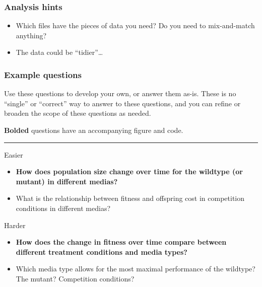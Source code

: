 \documentclass[
  letterpaper,
  DIV=11,
  numbers=noendperiod]{scrreprt}
\providecommand{\tightlist}{%
  \setlength{\itemsep}{0pt}\setlength{\parskip}{0pt}}\usepackage{longtable,booktabs,array}
\begin{document}
\begin{tcolorbox}[enhanced jigsaw, left=2mm, colframe=quarto-callout-tip-color-frame, leftrule=.75mm, opacitybacktitle=0.6, toptitle=1mm, title=\textcolor{quarto-callout-tip-color}{\faLightbulb}\hspace{0.5em}{Tip}, opacityback=0, coltitle=black, colbacktitle=quarto-callout-tip-color!10!white, breakable, colback=white, titlerule=0mm, bottomrule=.15mm, arc=.35mm, bottomtitle=1mm, rightrule=.15mm, toprule=.15mm]

\hypertarget{analysis-hints}{%
\subsubsection{Analysis hints}\label{analysis-hints}}

\begin{itemize}
\item
  Which files have the pieces of data you need? Do you need to
  mix-and-match anything?
\item
  The data could be ``tidier''\ldots{}
\end{itemize}

\hypertarget{example-questions}{%
\subsubsection{Example questions}\label{example-questions}}

Use these questions to develop your own, or answer them as-is. These is
no ``single'' or ``correct'' way to answer to these questions, and you
can refine or broaden the scope of these questions as needed.

\textbf{Bolded} questions have an accompanying figure and code.

\begin{center}\rule{0.5\linewidth}{0.5pt}\end{center}

Easier

\begin{itemize}
\tightlist
\item
  \textbf{How does population size change over time for the wildtype (or
  mutant) in different medias?}
\item
  What is the relationship between fitness and offspring cost in
  competition conditions in different medias?
\end{itemize}

Harder

\begin{itemize}
\tightlist
\item
  \textbf{How does the change in fitness over time compare between
  different treatment conditions and media types?}
\item
  Which media type allows for the most maximal performance of the
  wildtype? The mutant? Competition conditions?
\end{itemize}


\end{tcolorbox}
\end{document}
